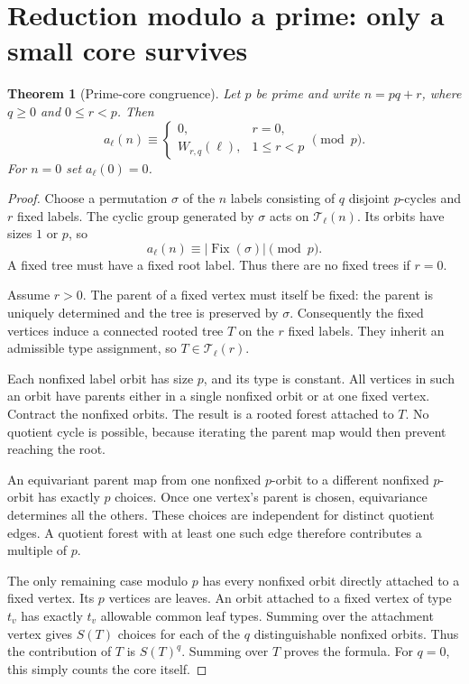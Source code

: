 \documentclass[11pt,letterpaper]{article}
\newtheorem{theorem}{Theorem}[section]
\theoremstyle{definition}
\theoremstyle{remark}
\newcommand{\T}{\mathcal T}
\newcommand{\Fix}{\operatorname{Fix}}
\begin{document}
\section{Reduction modulo a prime: only a small core survives}\label{sec:prime}
\begin{theorem}[Prime-core congruence]\label{thm:prime}
Let $p$ be prime and write $n=pq+r$, where $q\ge0$ and $0\le r<p$.
Then
\begin{equation}\label{eq:primecore}
 a_\ell(n)\equiv
 \begin{cases}
 0,&r=0,\\
 W_{r,q}(\ell),&1\le r<p
 \end{cases}\pmod p.
\end{equation}
For $n=0$ set $a_\ell(0)=0$.
\end{theorem}
\begin{proof}
Choose a permutation $\sigma$ of the $n$ labels consisting of $q$
disjoint $p$-cycles and $r$ fixed labels. The cyclic group generated by
$\sigma$ acts on $\T_\ell(n)$. Its orbits have sizes $1$ or $p$, so
\[
 a_\ell(n)\equiv |\Fix(\sigma)|\pmod p.
\]
A fixed tree must have a fixed root label. Thus there are no fixed trees
if $r=0$.

Assume $r>0$. The parent of a fixed vertex must itself be fixed: the
parent is uniquely determined and the tree is preserved by $\sigma$.
Consequently the fixed vertices induce a connected rooted tree $T$ on
the $r$ fixed labels. They inherit an admissible type assignment, so
$T\in\T_\ell(r)$.

Each nonfixed label orbit has size $p$, and its type is constant. All
vertices in such an orbit have parents either in a single nonfixed
orbit or at one fixed vertex. Contract the nonfixed orbits. The result
is a rooted forest attached to $T$. No quotient cycle is possible,
because iterating the parent map would then prevent reaching the root.

An equivariant parent map from one nonfixed $p$-orbit to a different
nonfixed $p$-orbit has exactly $p$ choices. Once one vertex's parent is
chosen, equivariance determines all the others. These choices are
independent for distinct quotient edges. A quotient forest with at
least one such edge therefore contributes a multiple of $p$.

The only remaining case modulo $p$ has every nonfixed orbit directly
attached to a fixed vertex. Its $p$ vertices are leaves. An orbit
attached to a fixed vertex of type $t_v$ has exactly $t_v$ allowable
common leaf types. Summing over the attachment vertex gives $S(T)$
choices for each of the $q$ distinguishable nonfixed orbits. Thus the
contribution of $T$ is $S(T)^q$. Summing over $T$ proves the formula.
For $q=0$, this simply counts the core itself.
\end{proof}
\end{document}
